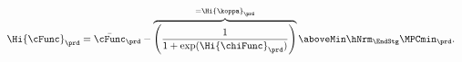   \begin{equation}\begin{gathered}\begin{aligned}
        \Hi{\cFunc}_{\prd}  & = \bar{\cFunc}_{\prd}-\overbrace{\left(\frac{1}{1+\exp(\Hi{\chiFunc}_{\prd})}\right)}^{=\Hi{\koppa}_{\prd}} \aboveMin \hNrm_{\EndStg} \MPCmin_{\prd}. \label{eq:cFuncHi}
      \end{aligned}\end{gathered}\end{equation}
